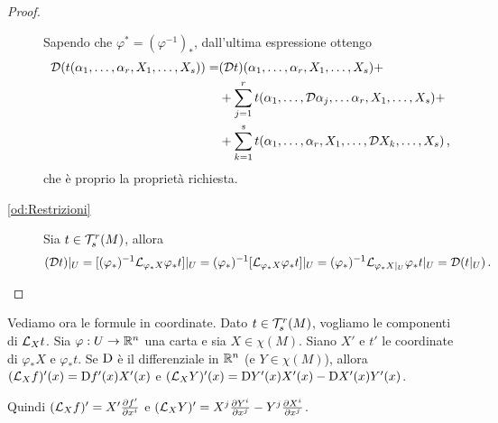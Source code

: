 \begin{proof}
\begin{description}
	Sapendo che $\varphi^*=(\varphi^{-1})_*$, dall'ultima espressione ottengo
	\begin{align*}
		\mathcal D(t(\alpha_1,\ldots,\alpha_r,X_1,\ldots,X_s)) =& (\mathcal D t)(\alpha_1,\ldots,\alpha_r,X_1,\ldots,X_s)+\\
		&+\sum_{j=1}^r{t(\alpha_1,\ldots,\mathcal D \alpha_j, \ldots \alpha_r,X_1,\ldots,X_s)} +\\
		&+\sum_{k=1}^s{t(\alpha_1,\ldots, \alpha_r,X_1,\ldots,\mathcal D X_k, \ldots,X_s)} \, \text{, }
	\end{align*}
	che è proprio la proprietà richiesta.
	
	\item [\ref{od:Restrizioni}]
		Sia $t\in\mathcal T_s^r(M)$, allora
		\begin{equation*}
			(\mathcal Dt)|_ U = [(\varphi_*)^{-1} \mathcal L_{\varphi_*X}\varphi_*t]|_ U 
			= (\varphi_*)^{-1}[\mathcal L_{\varphi_*X}\varphi_*t]|_ U 
			= (\varphi_*)^{-1} \mathcal L_{\varphi_*X|_ U}\varphi_*t |_ U = \mathcal D(t|_ U) \, \text{. }
		\end{equation*}
	\end{description}
\end{proof}

Vediamo ora le formule in coordinate.
Dato $t\in\mathcal T_s^r(M)$, vogliamo le componenti di $\mathcal L_Xt$.
Sia $\varphi: U \to \mathbb R^n$ una carta e sia $X\in\chi(M)$. Siano $X'$ e $t'$ le coordinate di $\varphi_*X$ e $\varphi_*t$.
Se $\mathrm D$ è il differenziale in $\mathbb R^n$ (e $Y\in\chi(M)$), allora
$(\mathcal L_Xf)' (x) = \mathrm D f'(x) X'(x)$ e $(\mathcal L_XY)'(x) = \mathrm D Y'(x)X'(x) - \mathrm D X'(x)Y'(x)$.

Quindi $(\mathcal L_X f)' = X' \frac{\partial f'}{\partial x^i}$ e $(\mathcal L_XY)' = X^j\frac{\partial Y^i}{\partial x^j} - Y^j\frac{\partial X^i}{\partial x^j}$.

